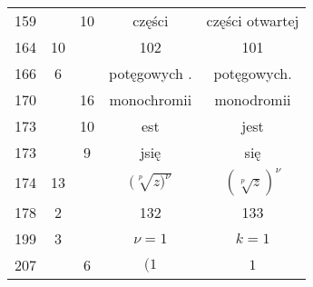 \documentclass[a4paper,11pt]{article}
\begin{document}
\begin{center}
\begin{tabular}{|c|c|c|c|c|}
    159 & & 10 & części & części otwartej \\
    164 & 10 & & 102 & 101 \\
    166 &  6 & & potęgowych . & potęgowych. \\
    170 & & 16 & monochromii & monodromii \\
    173 & & 10 & est & jest \\
    173 & &  9 & jsię & się \\
    174 & 13 & & $( \sqrt[p]{ z )^{ \nu } }$ & $( \sqrt[p]{ z } )^{ \nu }$ \\
    178 &  2 & & 132 & 133 \\
    199 &  3 & & $\nu = 1$ & $k = 1$ \\
    207 & &  6 & $( 1$ & $1$ \\
    \hline
  \end{tabular}

\end{center}

\vspace{\spaceTwo}
\end{document}
